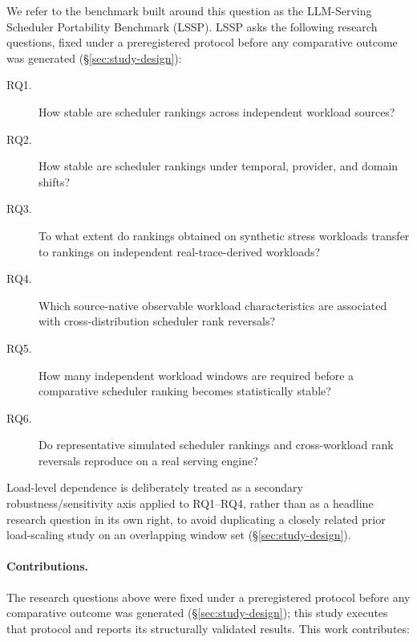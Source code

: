 We refer to the benchmark built around this question as the LLM-Serving
Scheduler Portability Benchmark (LSSP). LSSP asks the following research
questions, fixed under a preregistered protocol before any comparative
outcome was generated (\S\ref{sec:study-design}):

\begin{description}
  \item[RQ1.] How stable are scheduler rankings across independent
    workload sources?
  \item[RQ2.] How stable are scheduler rankings under temporal, provider,
    and domain shifts?
  \item[RQ3.] To what extent do rankings obtained on synthetic stress
    workloads transfer to rankings on independent real-trace-derived
    workloads?
  \item[RQ4.] Which source-native observable workload characteristics are
    associated with cross-distribution scheduler rank reversals?
  \item[RQ5.] How many independent workload windows are required before a
    comparative scheduler ranking becomes statistically stable?
  \item[RQ6.] Do representative simulated scheduler rankings and
    cross-workload rank reversals reproduce on a real serving engine?
\end{description}

Load-level dependence is deliberately treated as a secondary
robustness/sensitivity axis applied to RQ1--RQ4, rather than as a headline
research question in its own right, to avoid duplicating a closely related
prior load-scaling study on an overlapping window set
(\S\ref{sec:study-design}).

\paragraph{Contributions.} The research questions above were fixed under a
preregistered protocol before any comparative outcome was generated
(\S\ref{sec:study-design}); this study executes that protocol and reports
its structurally validated results. This work contributes:

